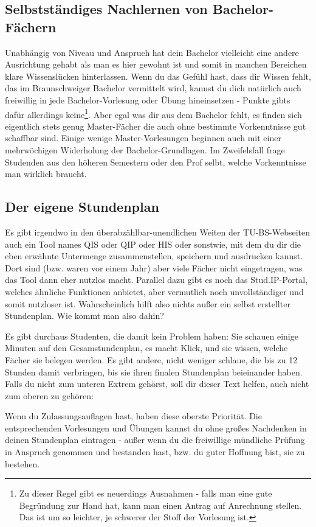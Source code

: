 \begin{multicols}{2}
\subsection{Selbstständiges Nachlernen von Bachelor-Fächern}
Unabhängig von Niveau und Anspruch hat dein Bachelor vielleicht eine andere Ausrichtung gehabt als man es hier gewohnt ist und somit in manchen Bereichen klare Wissenslücken hinterlassen. Wenn du das Gefühl hast, dass dir Wissen fehlt, das im Braunschweiger Bachelor vermittelt wird, kannst du dich natürlich auch freiwillig in jede Bachelor-Vorlesung oder Übung hineinsetzen - Punkte gibts dafür allerdings keine\footnote{Zu dieser Regel gibt es neuerdings Ausnahmen - falls man eine gute Begründung zur Hand hat, kann man einen Antrag auf Anrechnung stellen. Das ist um so leichter, je schwerer der Stoff der Vorlesung ist.}. Aber egal was dir aus dem Bachelor fehlt, es finden sich eigentlich stets genug Master-Fächer die auch ohne bestimmte Vorkenntnisse gut schaffbar sind. Einige wenige Master-Vorlesungen beginnen auch mit einer mehrwöchigen Widerholung der Bachelor-Grundlagen. Im Zweifelsfall frage Studenden aus den höheren Semestern oder den Prof selbt, welche Vorkenntnisse man wirklich braucht.
\label{masterstundenplan}
\subsection{Der eigene Stundenplan}
Es gibt irgendwo in den überabzählbar-unendlichen Weiten der TU-BS-Webseiten auch ein Tool names QIS oder QIP oder HIS oder sonstwie, mit dem du dir die eben erwähnte Untermenge zusammenstellen, speichern und ausdrucken kannst. Dort sind (bzw. waren vor einem Jahr) aber viele Fächer nicht eingetragen, was das Tool dann eher nutzlos macht. Parallel dazu gibt es noch das Stud.IP-Portal, welches ähnliche Funktionen anbietet, aber vermutlich noch unvollständiger und somit nutzloser ist. Wahrscheinlich hilft also nichts außer ein selbst erstellter Stundenplan. Wie kommt man also dahin?

Es gibt durchaus Studenten, die damit kein Problem haben: Sie schauen einige Minuten auf den Gesamstundenplan, es macht Klick, und sie wissen, welche Fächer sie belegen werden. Es gibt andere, nicht weniger schlaue, die bis zu 12 Stunden damit verbringen, bis sie ihren finalen Stundenplan beieinander haben. Falls du nicht zum unteren Extrem gehörst, soll dir dieser Text helfen, auch nicht zum oberen zu gehören:

Wenn du Zulassungsauflagen hast, haben diese oberste Priorität. Die entsprechenden Vorlesungen und Übungen kannst du ohne großes Nachdenken in deinen Stundenplan eintragen - außer wenn du die freiwillige mündliche Prüfung in Anspruch genommen und bestanden hast, bzw. du guter Hoffnung bist, sie zu bestehen.


\end{multicols}
